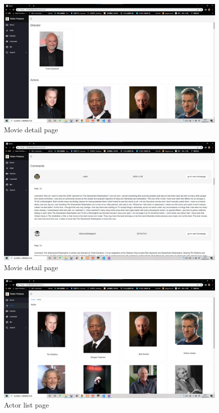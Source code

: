 \begin{CJK*}{UTF8}{gbsn}
    \begin{figure}[htbp]
    \centering
    \includegraphics[width=1\textwidth]{res_movie3.png}
    \caption{Movie detail page}
    \end{figure}
    
    \begin{figure}[htbp]
    \centering
    \includegraphics[width=1\textwidth]{res_movie4.png}
    \caption{Movie detail page}
    \end{figure}
    
    \begin{figure}[htbp]
    \centering
    \includegraphics[width=1\textwidth]{res_actor1.png}
    \caption{Actor list page}
    \end{figure}
    

\end{CJK*}
